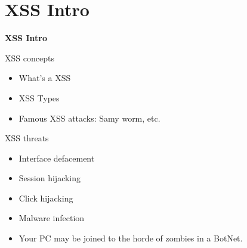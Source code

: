 
\section{XSS Intro}

\begin{frame}[plain]
    \begin{center}
      \Huge\bfseries
      XSS Intro
    \end{center}
\end{frame}

\begin{frame}{XSS concepts}
  \begin{itemize}
    \item What's a XSS
    \item XSS Types
    \item Famous XSS attacks: Samy worm, etc.
  \end{itemize}
\end{frame}

\begin{frame}{XSS threats}
  \begin{itemize}
    \item Interface defacement
    \item Session hijacking
    \item Click hijacking
    \item Malware infection
    \item Your PC may be joined to the horde of zombies in a BotNet.
  \end{itemize}
\end{frame}
